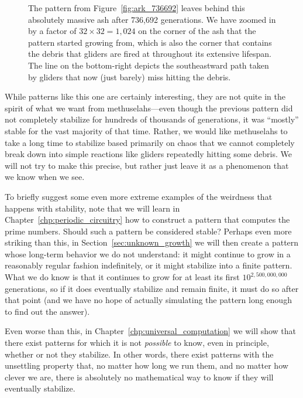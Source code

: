 \begin{figure}[!htb]
		
	\caption{The pattern from Figure~\ref{fig:ark_736692} leaves behind this absolutely massive ash after 736,692 generations. We have zoomed in by a factor of $32 \times 32 = 1,024$ on the corner of the ash that the pattern started growing from, which is also the corner that contains the debris that gliders are fired at throughout its extensive lifespan. The  line on the bottom-right depicts the southeastward path taken by gliders that now (just barely) miss hitting the debris.}\label{fig:ark_736692_stabilized}
\end{figure}

While patterns like this one are certainly interesting, they are not quite in the spirit of what we want from methuselahs---even though the previous pattern did not completely stabilize for hundreds of thousands of generations, it was ``mostly'' stable for the vast majority of that time. Rather, we would like methuselahs to take a long time to stabilize based primarily on chaos that we cannot completely break down into simple reactions like gliders repeatedly hitting some debris. We will not try to make this precise, but rather just leave it as a phenomenon that we know when we see.

To briefly suggest some even more extreme examples of the weirdness that happens with stability, note that we will learn in Chapter~\ref{chp:periodic_circuitry} how to construct a pattern that computes the prime numbers. Should such a pattern be considered stable? Perhaps even more striking than this, in Section~\ref{sec:unknown_growth} we will then create a pattern whose long-term behavior we do not understand: it might continue to grow in a reasonably regular fashion indefinitely, or it might stabilize into a finite pattern. What we do know is that it continues to grow for at least its first $10^{2,500,000,000}$ generations, so if it does eventually stabilize and remain finite, it must do so after that point (and we have no hope of actually simulating the pattern long enough to find out the answer).

Even worse than this, in Chapter~\ref{chp:universal_computation} we will show that there exist patterns for which it is not \emph{possible} to know, even in principle, whether or not they stabilize. In other words, there exist patterns with the unsettling property that, no matter how long we run them, and no matter how clever we are, there is absolutely no mathematical way to know if they will eventually stabilize.


